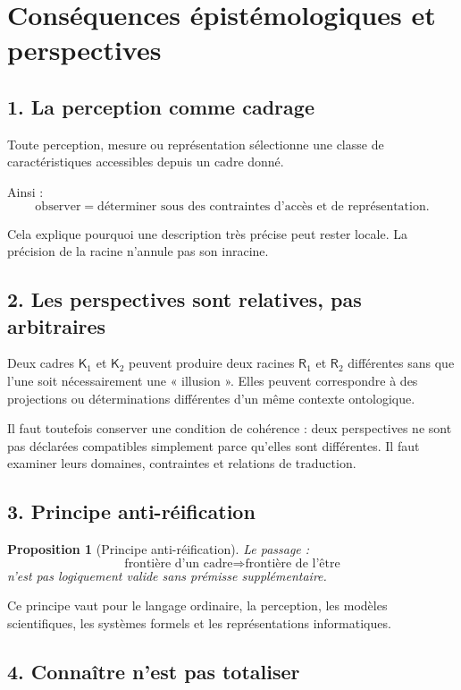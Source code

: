 \documentclass[11pt,a4paper]{article}
\newtheorem{proposition}{Proposition}[section]
\newcommand{\Rac}{\mathsf{R}}
\newcommand{\Cadre}{\mathsf{K}}
\begin{document}
\section{Conséquences épistémologiques et perspectives}

\subsection{1. La perception comme cadrage}

Toute perception, mesure ou représentation sélectionne une classe de
caractéristiques accessibles depuis un cadre donné.

Ainsi :
\[
\boxed{
\text{observer}=\text{déterminer sous des contraintes d'accès et de représentation}.
}
\]

Cela explique pourquoi une description très précise peut rester locale.
La précision de la racine n'annule pas son inracine.

\subsection{2. Les perspectives sont relatives, pas arbitraires}

Deux cadres \(\Cadre_1\) et \(\Cadre_2\) peuvent produire deux racines
\(\Rac_1\) et \(\Rac_2\) différentes sans que l'une soit nécessairement une
« illusion ». Elles peuvent correspondre à des projections ou déterminations
différentes d'un même contexte ontologique.

Il faut toutefois conserver une condition de cohérence : deux perspectives ne
sont pas déclarées compatibles simplement parce qu'elles sont différentes.
Il faut examiner leurs domaines, contraintes et relations de traduction.

\subsection{3. Principe anti-réification}

\begin{proposition}[Principe anti-réification]
Le passage :
\[
\text{frontière d'un cadre}
\Rightarrow
\text{frontière de l'être}
\]
n'est pas logiquement valide sans prémisse supplémentaire.
\end{proposition}

Ce principe vaut pour le langage ordinaire, la perception, les modèles
scientifiques, les systèmes formels et les représentations informatiques.

\subsection{4. Connaître n'est pas totaliser}
\end{document}
